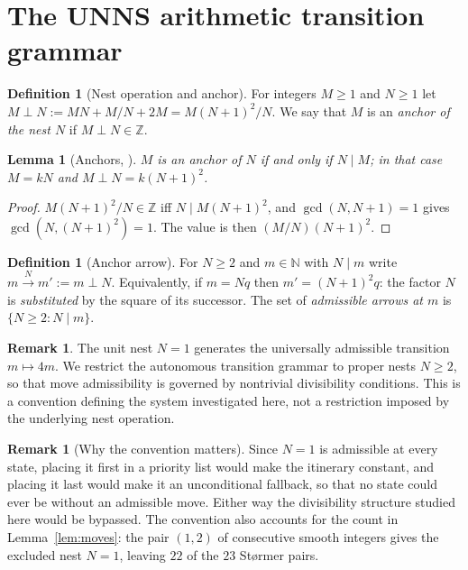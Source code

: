 \documentclass[11pt,a4paper]{article}
\newtheorem{lemma}[theorem]{Lemma}
\theoremstyle{definition}
\newtheorem{definition}[theorem]{Definition}
\newtheorem{remark}[theorem]{Remark}
\newcommand{\N}{\mathbb{N}}
\newcommand{\Z}{\mathbb{Z}}
\newcommand{\nest}{\mathbin{\perp}}
\begin{document}
\section{The UNNS arithmetic transition grammar}\label{sec:grammar}

\begin{definition}[Nest operation and anchor]\label{def:nest}
For integers $M\ge1$ and $N\ge1$ let $M\nest N := MN + M/N + 2M = M(N+1)^2/N$. We say that $M$ is an \emph{anchor of the nest $N$} if $M\nest N\in\Z$.
\end{definition}

\begin{lemma}[Anchors, \cite{unns-intro}]\label{lem:anchor}
$M$ is an anchor of $N$ if and only if $N\mid M$; in that case $M=kN$ and $M\nest N = k(N+1)^2$.
\end{lemma}
\begin{proof}
$M(N+1)^2/N\in\Z$ iff $N\mid M(N+1)^2$, and $\gcd(N,N+1)=1$ gives $\gcd(N,(N+1)^2)=1$. The value is then $(M/N)(N+1)^2$.
\end{proof}

\begin{definition}[Anchor arrow]\label{def:arrow}
For $N\ge 2$ and $m\in\N$ with $N\mid m$ write $m\xrightarrow{N} m':=m\nest N$. Equivalently, if $m=Nq$ then $m'=(N+1)^2q$: the factor $N$ is \emph{substituted} by the square of its successor. The set of \emph{admissible arrows at $m$} is $\{N\ge2: N\mid m\}$.
\end{definition}

\begin{remark}\label{rem:unit}
The unit nest $N=1$ generates the universally admissible transition $m\mapsto 4m$. We restrict the autonomous transition grammar to proper nests $N\ge 2$, so that move admissibility is governed by nontrivial divisibility conditions. This is a convention defining the system investigated here, not a restriction imposed by the underlying nest operation.
\end{remark}

\begin{remark}[Why the convention matters]\label{rem:unit2}
Since $N=1$ is admissible at every state, placing it first in a priority list would make the itinerary constant, and placing it last would make it an unconditional fallback, so that no state could ever be without an admissible move. Either way the divisibility structure studied here would be bypassed. The convention also accounts for the count in Lemma~\ref{lem:moves}: the pair $(1,2)$ of consecutive smooth integers gives the excluded nest $N=1$, leaving $22$ of the $23$ Størmer pairs.
\end{remark}
\end{document}
